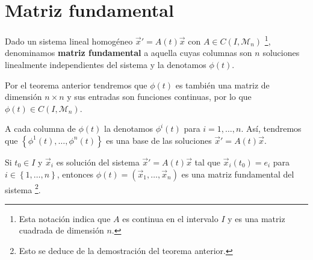 \section{Matriz fundamental}

\begin{definition}
Dado un sistema lineal homogéneo $\displaystyle \vec{x}' = A\left(t\right)\vec{x} $ con $\displaystyle A \in C\left(I, \mathcal{M}_{n}\right) $ \footnote{Esta notación indica que $\displaystyle A $ es continua en el intervalo $\displaystyle I $ y es una matriz cuadrada de dimensión $\displaystyle n $.}, denominamos \textbf{matriz fundamental} a aquella cuyas columnas son $\displaystyle n $ soluciones linealmente independientes del sistema y la denotamos $\displaystyle \phi\left(t\right) $. 
\end{definition}
\begin{observation}
Por el teorema anterior tendremos que $\displaystyle \phi\left(t\right) $ es también una matriz de dimensión $\displaystyle n \times n $ y sus entradas son funciones continuas, por lo que $\displaystyle \phi\left(t\right)\in C\left(I, \mathcal{M}_{n}\right) $. 
\end{observation}
\begin{notation}
	A cada columna de $\displaystyle \phi\left(t\right) $ la denotamos $\displaystyle \phi^{i}\left(t\right) $ para $\displaystyle i= 1, \ldots, n $. Así, tendremos que $\displaystyle \left\{ \phi^{1}\left(t\right), \ldots, \phi^{n}\left(t\right)\right\}  $ es una base de las soluciones $\displaystyle \vec{x}' = A\left(t\right)\vec{x} $. 
\end{notation}
\begin{eg}
	Si $\displaystyle t_{0} \in I $ y $\displaystyle \vec{x}_{i} $ es solución del sistema $\displaystyle \vec{x}' = A\left(t\right)\vec{x} $ tal que $\displaystyle \vec{x}_{i}\left(t_{0}\right)=e_{i} $ para $\displaystyle i \in \left\{ 1, \ldots, n\right\}  $, entonces $\displaystyle \phi\left(t\right)=\left(\vec{x}_{1}, \ldots, \vec{x}_{n}\right) $ es una matriz fundamental del sistema \footnote{Esto se deduce de la demostración del teorema anterior.}. 
\end{eg}

